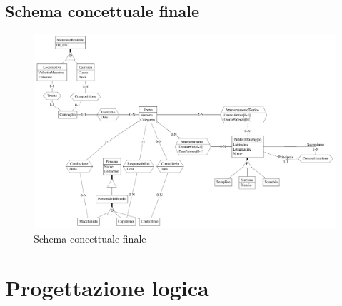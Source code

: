 \documentclass[a4paper,12pt]{report}
\begin{document}
	\section{Schema concettuale finale}
	\begin{figure}[h!]
		\begin{center}
			\includegraphics[angle=270,width=.95\linewidth]{res/schema/full}
		\end{center}
		\caption{Schema concettuale finale}
	\end{figure}
	\chapter{Progettazione logica}
\end{document}
